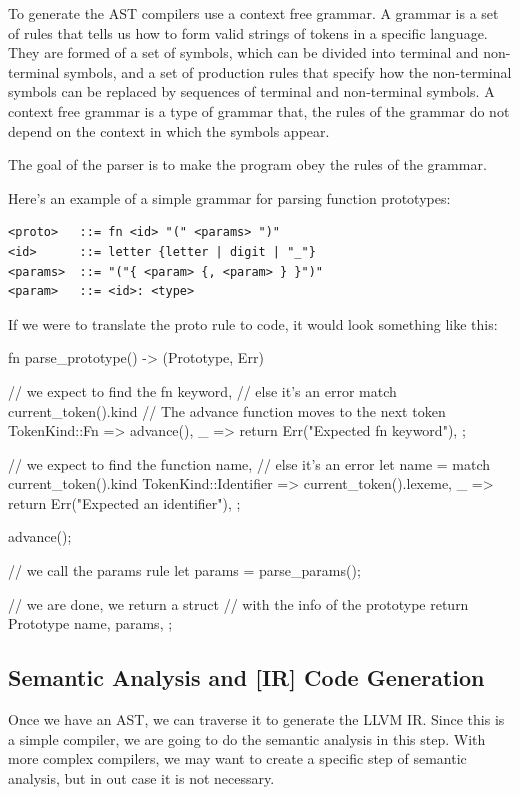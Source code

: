﻿\documentclass[10pt,a4paper,twocolumn,twoside]{article}
\begin{document}
To generate the AST compilers use a context free grammar. A grammar is a set of
rules that tells us how to form valid strings of tokens in a specific language.
They are formed of a set of symbols, which can be divided into terminal and
non-terminal symbols, and a set of production rules that specify how the
non-terminal symbols can be replaced by sequences of terminal and non-terminal
symbols. A context free grammar is a type of grammar that, the rules of the grammar do
not depend on the context in which the symbols appear.

The goal of the parser is to make the program obey the rules of the grammar.

Here's an example of a simple grammar for parsing function prototypes:

\begin{small}
\begin{verbatim}
<proto>   ::= fn <id> "(" <params> ")"
<id>      ::= letter {letter | digit | "_"}
<params>  ::= "("{ <param> {, <param> } }")"
<param>   ::= <id>: <type>
\end{verbatim}
\end{small}

If we were to translate the proto rule to code, it would look something like 
this:

\begin{code}
fn parse_prototype() -> (Prototype, Err) {
    // we expect to find the fn keyword,
    // else it's an error
    match current_token().kind {
        // The advance function moves to the next token
        TokenKind::Fn => advance(),
        _ => return Err("Expected fn keyword"),
    };

    // we expect to find the function name,
    // else it's an error
    let name = match current_token().kind {
        TokenKind::Identifier => current_token().lexeme,
        _ => return Err("Expected an identifier"),
    };

    advance();

    // we call the params rule
    let params = parse_params();

    // we are done, we return a struct 
    // with the info of the prototype
    return Prototype { 
        name,
        params,
    };
}
\end{code}

\subsection{Semantic Analysis and [IR] Code Generation}
Once we have an AST, we can traverse it to generate the LLVM IR. Since this is a
simple compiler, we are going to do the semantic analysis in this step. With 
more complex compilers, we may want to create a specific step of semantic 
analysis, but in out case it is not necessary.
\end{document}
